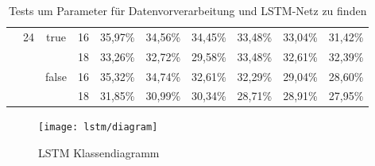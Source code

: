 \begin{sidewaystable*}
\begin{tabular}{|c|c|c|c|c|c|c|c|c|c|}
  &\multirow{4}{*}{24}&\multirow{2}{*}{true}&16&35,97\%&34,56\%&34,45\%&33,48\%&33,04\%&31,42\%\\\cline{4-10}
  & & &18&33,26\%&32,72\%&29,58\%&33,48\%&32,61\%&32,39\%\\\cline{3-10}
  & &\multirow{2}{*}{false}&16&35,32\%&34,74\%&32,61\%&32,29\%&29,04\%&28,60\%\\\cline{4-10}
  & & &18&31,85\%&30,99\%&30,34\%&28,71\%&28,91\%&27,95\%\\
\hline
\end{tabular} 
\caption[Tests für Daten und LSTM-Netz]{Tests um Parameter für Datenvorverarbeitung und LSTM-Netz zu finden}
\label{tab:inputtests}
\end{sidewaystable*}

\begin{figure*}[htfp]
  \begin{center}
  \texttt{[image: lstm/diagram]}
  \caption[\acs{LSTM} Klassendiagramm]{\acs{LSTM} Klassendiagramm}
  \label{fig:lstm_class}
  \end{center}
\end{figure*}  
